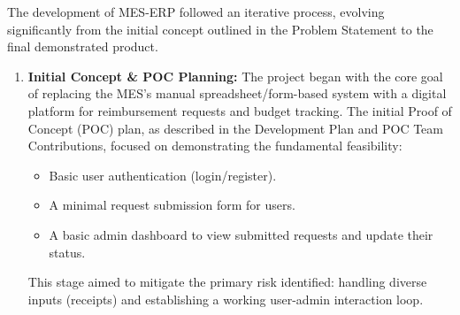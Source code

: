 \documentclass{article}
\begin{document}
The development of MES-ERP followed an iterative process, evolving significantly from the initial concept outlined in the Problem Statement to the final demonstrated product.

\begin{enumerate}
    \item \textbf{Initial Concept \& POC Planning:} The project began with the core goal of replacing the MES's manual spreadsheet/form-based system with a digital platform for reimbursement requests and budget tracking. The initial Proof of Concept (POC) plan, as described in the Development Plan and POC Team Contributions, focused on demonstrating the fundamental feasibility:
        \begin{itemize}
            \item Basic user authentication (login/register).
            \item A minimal request submission form for users.
            \item A basic admin dashboard to view submitted requests and update their status.
        \end{itemize}
        This stage aimed to mitigate the primary risk identified: handling diverse inputs (receipts) and establishing a working user-admin interaction loop.


\end{enumerate}
\end{document}
